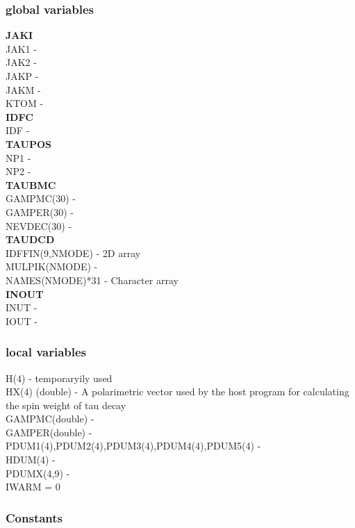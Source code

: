 \documentclass[12pt]{article}
\begin{document}
\subsubsection{global variables}
\textbf{JAKI}\\
JAK1 - \\
JAK2 - \\
JAKP - \\
JAKM - \\
KTOM - \\

\textbf{IDFC}\\
IDF - \\

\textbf{TAUPOS}\\
NP1 - \\
NP2 - \\

\textbf{TAUBMC} \\
GAMPMC(30) - \\
GAMPER(30) - \\
NEVDEC(30) - \\

\textbf{TAUDCD} \\
IDFFIN(9,NMODE) -  2D array\\
MULPIK(NMODE) - \\
NAMES(NMODE)*31 - Character array\\

\textbf{INOUT}\\
INUT - \\
IOUT - \\

\subsubsection{local variables}

H(4) - temporaryily used\\
HX(4) (double) - A polarimetric vector used by the host program for calculating the spin weight of tau decay\\
GAMPMC(double) - \\
GAMPER(double) - \\
PDUM1(4),PDUM2(4),PDUM3(4),PDUM4(4),PDUM5(4) - \\
HDUM(4) - \\
PDUMX(4,9) - \\
IWARM = 0\\

\subsubsection{Constants}
\end{document}
